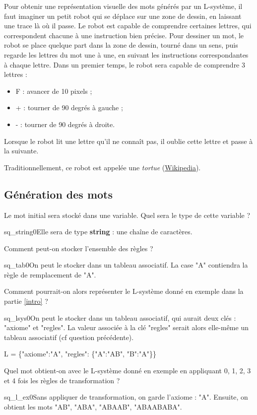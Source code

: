 \documentclass[a4paper,11pt,answers]{exam}
\newcommand\ocgsolution[2]{\begin{solution}\showocgs{#1}{$\longrightarrow$} \begin{ocg}{s}{#1}{0}#2\end{ocg}\end{solution}}
\begin{document}
	Pour obtenir une représentation visuelle des mots générés par un L-système, il faut imaginer un petit robot qui se déplace sur une zone de dessin, en laissant une trace là où il passe. Le robot est capable de comprendre certaines lettres, qui correspondent chacune à une instruction bien précise.
	Pour dessiner un mot, le robot se place quelque part dans la zone de dessin, tourné dans un sens, puis regarde les lettres du mot une à une, en suivant les instructions correspondantes à chaque lettre.
	Dans un premier temps, le robot sera capable de comprendre 3 lettres :
	\begin{itemize}
		\item F : avancer de 10 pixels ;
		\item + : tourner de 90 degrés à gauche ;
		\item - : tourner de 90 degrés à droite.
	\end{itemize}
	Lorsque le robot lit une lettre qu'il ne connaît pas, il oublie cette lettre et passe à la suivante.
	
	Traditionnellement, ce robot est appelée une \emph{tortue} (\href{https://en.wikipedia.org/wiki/Turtle_graphics}{Wikipedia}).
	
	\subsection{Génération des mots}
	\begin{questions}
		\question Le mot initial sera stocké dans une variable. Quel sera le type de cette variable ?
		\ocgsolution{q_string}{Elle sera de type \textbf{string} : une chaîne de caractères.}
		\question Comment peut-on stocker l'ensemble des règles ?
		\ocgsolution{q_tab}{On peut le stocker dans un tableau associatif. La case "A" contiendra la règle de remplacement de "A".}
		\question Comment pourrait-on alors représenter le L-système donné en exemple dans la partie \ref{intro} ?
		\ocgsolution{q_lsys}{On peut le stocker dans un tableau associatif, qui aurait deux clés : "axiome" et "regles". La valeur associée à la clé "regles" serait alors elle-même un tableau associatif (cf question précédente).
		
		L = \{"axiome":"A", "regles": \{"A":"AB", "B":"A"\}\}}
		\question Quel mot obtient-on avec le L-système donné en exemple en appliquant 0, 1, 2, 3 et 4 fois les règles de transformation ?
		\ocgsolution{q_l_ex}{Sans appliquer de transformation, on garde l'axiome : "A". Ensuite, on obtient les mots "AB", "ABA", "ABAAB", "ABAABABA".}
		\xdef\mycounter{\arabic{question}}
	\end{questions}
\end{document}
